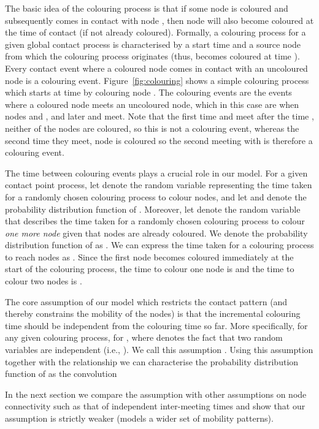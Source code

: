 \documentclass{article}
\begin{document}
The basic idea of the colouring process is that if some node  is
coloured and subsequently comes in contact with node , then node 
will also become coloured at the time of contact (if not already
coloured). Formally, a colouring process  for a given global
contact process is characterised by a start time  and a source
node  from which the colouring process originates (thus, 
becomes coloured at time ). Every contact event where a coloured
node comes in contact with an uncoloured node is a colouring
event. Figure~\ref{fig:colouring} shows a simple colouring process
 which starts at time  by colouring node . The
colouring events are the events where a coloured node meets an
uncoloured node, which in this case are when nodes  and , and
later  and  meet. Note that the first time  and  meet
after the time , neither of the nodes are coloured, so this is
not a colouring event, whereas the second time they meet, node  is
coloured so the second meeting with  is therefore a colouring event.

The time between colouring events plays a crucial role in our model.
For a given contact point process, let  denote the random
variable representing the time taken for a randomly chosen colouring
process to colour  nodes, and let  and denote the
probability distribution function of . Moreover, let 
denote the random variable that describes the time taken for a
randomly chosen colouring process to colour \emph{one more node} given
that  nodes are already coloured. We denote the probability
distribution function of  as . We can
express the time taken for a colouring process to reach  nodes as
. Since the first node becomes coloured
immediately at the start of the colouring process, the time to colour
one node is  and the time to colour two nodes is . 

The core assumption of our model which restricts the contact pattern
(and thereby constrains the mobility of the nodes) is that the incremental
colouring time should be independent from the colouring time so far.
More specifically, for any given colouring process, 
for , where  denotes the fact that two random
variables are independent (i.e., ). We call this assumption
. Using this assumption together with the relationship
 we can characterise the probability
distribution function of  as the convolution 


In the next section we compare the  assumption with other
assumptions on node connectivity such as that of independent
inter-meeting times and show that our assumption is strictly weaker
(models a wider set of mobility patterns).
\end{document}
